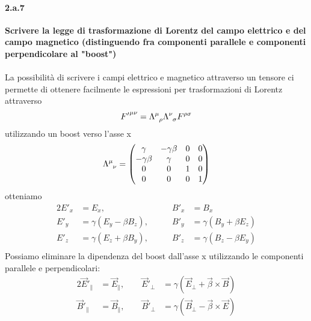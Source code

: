 \documentclass[twoside]{article}
\begin{document}
\paragraph{2.a.7}\textbf{Scrivere la legge di trasformazione di Lorentz del campo elettrico e del campo magnetico (distinguendo fra componenti parallele e componenti perpendicolare al "boost")}\\ \\
La possibilità di scrivere i campi elettrico e magnetico attraverso un tensore ci permette di ottenere facilmente le espressioni per trasformazioni di Lorentz attraverso
\begin{equation*}
    {F'}^{\mu\nu}=\tensor{\Lambda}{^{\mu}_{\rho}}\tensor{\Lambda}{^{\nu}_{\sigma}}F^{\rho\sigma}
\end{equation*}
utilizzando un boost verso l'asse x 
\begin{equation*}
    \tensor{\Lambda}{^{\mu}_{\nu}}=
    \begin{pmatrix}
        \gamma & -\gamma\beta & 0 & 0 \\
        -\gamma\beta & \gamma & 0 & 0 \\
        0 & 0 & 1 & 0 \\
        0 & 0 & 0 & 1 \\
    \end{pmatrix}
\end{equation*}
otteniamo
\begin{alignat*}{2}
    {E'}_x&=E_x,&\qquad{B'}_x&=B_x\\
    {E'}_y&=\gamma(E_y-\beta B_z),&\qquad{B'}_y&=\gamma(B_y+\beta E_z)\\
    {E'}_z&=\gamma(E_z+\beta B_y),&\qquad{B'}_z&=\gamma(B_z-\beta E_y)\\
\end{alignat*}
Possiamo eliminare la dipendenza del boost dall'asse x utilizzando le componenti parallele e perpendicolari:
\begin{alignat}{2}
    {\vec{E}'}_{\|}&=\vec{E}_{\|},\qquad{\vec{E}'}_{\perp}&=\gamma(\vec{E}_{\perp}+\vec{\beta}\times\vec{B})\\
    {\vec{B}'}_{\|}&=\vec{B}_{\|},\qquad{\vec{B}'}_{\perp}&=\gamma(\vec{B}_{\perp}-\vec{\beta}\times\vec{E})
\end{alignat}
\end{document}
